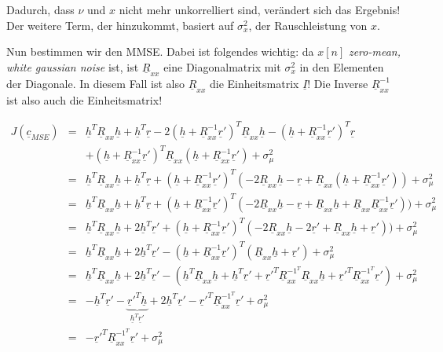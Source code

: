Dadurch, dass $\nu$ und $x$ nicht mehr unkorrelliert sind, verändert sich das Ergebnis! Der weitere Term, der hinzukommt, basiert auf $\sigma_x^2$, der Rauschleistung von $x$.

Nun bestimmen wir den MMSE. Dabei ist folgendes wichtig: da $x[n]$ \emph{zero-mean, white gaussian noise} ist, ist $\underline{R}_{xx}$ eine Diagonalmatrix mit $\sigma_x^2$ in den Elementen der Diagonale. In diesem Fall ist also $\underline{R}_{xx}$ die Einheitsmatrix $\underline{I}$! Die Inverse $\underline{R}_{xx}^{-1}$ ist also auch die Einheitsmatrix!

\begin{eqnarray}
	J(\underline{c}_{MSE}) & = & \underline{h}^T \underline{R}_{xx} \underline{h} + \underline{h}^T \underline{r} - 2 (\underline{h} + \underline{R}_{xx}^{-1} \underline{r}')^T  \underline{R}_{xx} \underline{h} - (\underline{h} + \underline{R}_{xx}^{-1} \underline{r}')^T \underline{r} \\
	& & + (\underline{h} + \underline{R}_{xx}^{-1} \underline{r}')^T \underline{R}_{xx} (\underline{h} + \underline{R}_{xx}^{-1} \underline{r}') + \sigma_\mu^2 \\
	& = & \underline{h}^T \underline{R}_{xx} \underline{h} + \underline{h}^T \underline{r} + (\underline{h} + \underline{R}_{xx}^{-1} \underline{r}')^T (-2 \underline{R}_{xx} \underline{h}  - \underline{r} + \underline{R}_{xx} (\underline{h} + \underline{R}_{xx}^{-1} \underline{r}')) + \sigma_\mu^2 \\
	& = & \underline{h}^T \underline{R}_{xx} \underline{h} + \underline{h}^T \underline{r} + (\underline{h} + \underline{R}_{xx}^{-1} \underline{r}')^T (-2 \underline{R}_{xx} \underline{h}  - \underline{r} + \underline{R}_{xx} \underline{h} + \underline{R}_{xx} \underline{R}_{xx}^{-1} \underline{r}')) + \sigma_\mu^2 \\
	& = & \underline{h}^T \underline{R}_{xx} \underline{h} + 2 \underline{h}^T \underline{r}' + (\underline{h} + \underline{R}_{xx}^{-1} \underline{r}')^T (-2 \underline{R}_{xx} \underline{h}  - 2 \underline{r}' + \underline{R}_{xx} \underline{h} + \underline{r}')) + \sigma_\mu^2 \\
	& = & \underline{h}^T \underline{R}_{xx} \underline{h} + 2 \underline{h}^T \underline{r}' - (\underline{h} + \underline{R}_{xx}^{-1} \underline{r}')^T (\underline{R}_{xx} \underline{h} + \underline{r}') + \sigma_\mu^2 \\
	& = & \underline{h}^T \underline{R}_{xx} \underline{h} + 2 \underline{h}^T \underline{r}' - (\underline{h}^T \underline{R}_{xx} \underline{h} + \underline{h}^T \underline{r}' + \underline{r}'^T \underline{R}_{xx}^{-1^T} \underline{R}_{xx} \underline{h} + \underline{r}'^T \underline{R}_{xx}^{-1^T} \underline{r}' ) + \sigma_\mu^2 \\
	& = & - \underline{h}^T \underline{r}' - \underbrace{\underline{r}'^T \underline{h}}_{\underline{h}^T \underline{r}'} + 2 \underline{h}^T \underline{r}' - \underline{r}'^T \underline{R}_{xx}^{-1^T} \underline{r}' + \sigma_\mu^2 \\
	& = & - \underline{r}'^T \underline{R}_{xx}^{-1^T} \underline{r}' + \sigma_\mu^2
\end{eqnarray}

